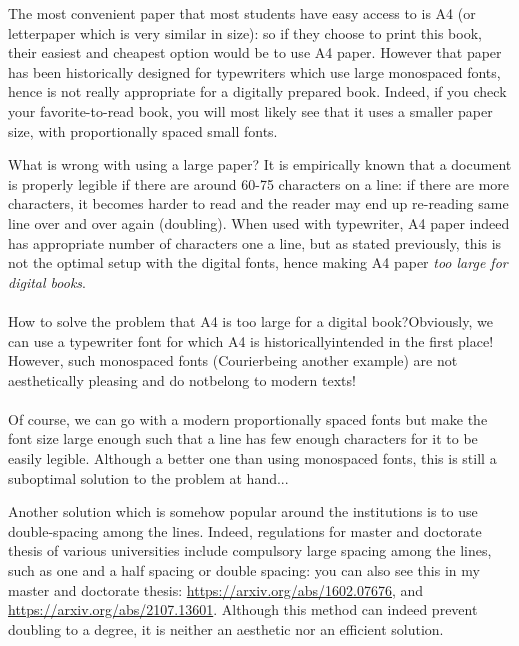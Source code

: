 The most convenient paper that most students have easy access to is A4 (or letterpaper which is very similar in size): so if they choose to print this book, their easiest and cheapest option would be to use A4 paper. However that paper has been historically designed for typewriters which use large monospaced fonts, hence is not really appropriate for a digitally prepared book. Indeed, if you check your favorite-to-read book, you will most likely see that it uses a smaller paper size, with proportionally spaced small fonts.

\beginfullwidth
\hphantom{\indent} What is wrong with using a large paper? It is empirically known that a document is properly legible if there are around 60-75 characters on a line: if there are more characters, it becomes harder to read and the reader may end up re-reading same line over and over again (doubling). When used with typewriter, A4 paper indeed has appropriate number of characters one a line, but as stated previously, this is not the optimal setup with the digital fonts, hence making A4 paper \emph{too large for digital books}.
\\\\
{\ttfamily \hphantom{\indent} How to solve the problem that A4 is too large for a digital book?\newline Obviously, we can use a typewriter font for which A4 is historically\newline intended in the first place! However, such monospaced fonts (Courier\newline being another example) are not aesthetically pleasing and do not\newline belong to modern texts!}
\\\\
{\LARGE \hphantom{\indent} Of course, we can go with a modern proportionally spaced fonts but make the font size large enough such that a line has few enough characters for it to be easily legible. Although a better one than using monospaced fonts, this is still a suboptimal solution to the problem at hand...}
%
\begin{DoubleSpace}
	Another solution which is somehow popular around the institutions is to use double-spacing among the lines. Indeed, regulations for master and doctorate thesis of various universities include compulsory large spacing among the lines, such as one and a half spacing or double spacing: you can also see this in my master and doctorate thesis: \href{https://arxiv.org/abs/1602.07676}{https://arxiv.org/abs/1602.07676}, and \href{https://arxiv.org/abs/2107.13601}{https://arxiv.org/abs/2107.13601}. Although this method can indeed prevent doubling to a degree, it is neither an aesthetic nor an efficient solution.
\end{DoubleSpace}
